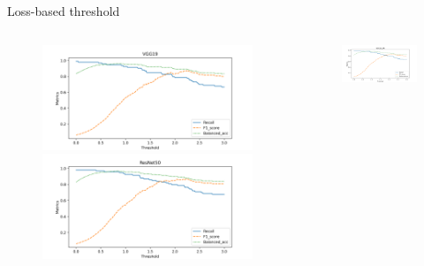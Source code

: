 \documentclass[aspectratio=169]{beamer}
\begin{document}
\begin{frame}{Loss-based threshold}
    \begin{columns}
        \begin{column}{0.45\textwidth}
            \begin{figure}
                \centering
                \includegraphics[width=\columnwidth]{./results/comparison/VGG19_threshold.png}
                \includegraphics[width=\columnwidth]{./results/comparison/ResNet50_threshold.png}
            \end{figure}
        \end{column}
        \begin{column}{0.45\textwidth}
            \begin{figure}
                \centering
                \includegraphics[width=\columnwidth]{./results/comparison/VGG19_BN_threshold.png}

\end{figure}
\end{column}
\end{columns}
\end{frame}
\end{document}
